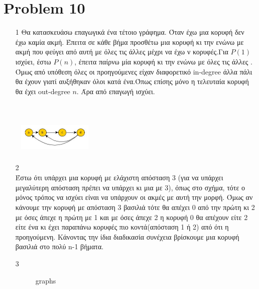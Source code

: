 \documentclass{article}
\begin{document}
\section*{Problem 10}
\begin{enumerate}
\item[1]
Θα κατασκευάσω επαγωγικά ένα τέτοιο γράφημα. Όταν έχω μια κορυφή δεν έχω καμία ακμή. Έπειτα σε κάθε βήμα προσθέτω μια κορυφή κι την ενώνω με ακμή που φεύγει από αυτή με όλες τις άλλες μέχρι να έχω ν κορυφές.Για $P(1)$ ισχύει, έστω $P(n)$, έπειτα παίρνω μία κορυφή κι την ενώνω με όλες τις άλλες . Όμως από υπόθεση όλες οι προηγούμενες είχαν διαφορετικό in-degree άλλα πάλι θα έχουν γιατί αυξήθηκαν όλοι κατά ένα.Όπως επίσης μόνο η τελευταία κορυφή θα έχει out-degree $n$. Άρα από επαγωγή ισχύει. 
\item[2]
\includegraphics[height=100pt,width=100pt]{ex10prob2} \\
Έστω ότι υπάρχει μια κορυφή με ελάχιστη απόσταση 3 (για να υπάρχει μεγαλύτερη απόσταση πρέπει να υπάρχει κι μια με 3), όπως στο σχήμα, τότε ο μόνος τρόπος να ισχύει είναι να υπάρχουν οι ακμές με αυτή την μορφή. Όμως αν κάνουμε την κορυφή με απόσταση 3 βασιλιά τότε θα απέχει 0 από την πρώτη κι 2 με όσες άπεχε η πρώτη με 1 και με όσες άπεχε 2 η κορυφή 0 θα απέχουν είτε 2 είτε ένα κι έχει παραπάνω κορυφές πιο κοντά(απόσταση 1 ή 2) από ότι η προηγούμενη. Κάνοντας την ίδια διαδικασία συνέχεια βρίσκουμε μια κορυφή βασιλιά στο πολύ n-1 βήματα.
\item[3]
\begin{figure}[ht!]
	\centering

	\qquad
	\caption{graphs}
	

\end{figure}
\end{enumerate}
\end{document}
